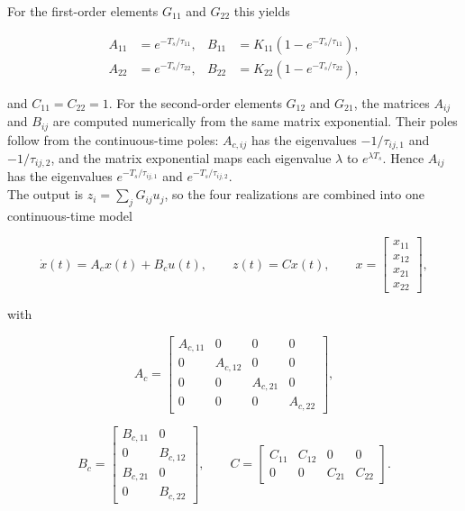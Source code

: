For the first-order elements $G_{11}$ and $G_{22}$ this yields

\begin{align}
  A_{11} &= e^{-T_s/\tau_{11}}, & B_{11} &= K_{11}\left(1-e^{-T_s/\tau_{11}}\right), \\
  A_{22} &= e^{-T_s/\tau_{22}}, & B_{22} &= K_{22}\left(1-e^{-T_s/\tau_{22}}\right),
\end{align}

and $C_{11}=C_{22}=1$. For the second-order elements $G_{12}$ and $G_{21}$, the matrices $A_{ij}$ and $B_{ij}$ are computed numerically from the same matrix exponential. Their poles follow from the continuous-time poles: $A_{c,ij}$ has the eigenvalues $-1/\tau_{ij,1}$ and $-1/\tau_{ij,2}$, and the matrix exponential maps each eigenvalue $\lambda$ to $e^{\lambda T_s}$. Hence $A_{ij}$ has the eigenvalues $e^{-T_s/\tau_{ij,1}}$ and $e^{-T_s/\tau_{ij,2}}$. \\

The output is $z_i=\sum_j G_{ij}u_j$, so the four realizations are combined into one continuous-time model

\begin{equation}
  \dot x(t)=A_cx(t)+B_cu(t),\qquad z(t)=Cx(t),\qquad
  x=\begin{bmatrix}x_{11}\\x_{12}\\x_{21}\\x_{22}\end{bmatrix},
\end{equation}

with

\begin{equation}
  A_c = \begin{bmatrix}
    A_{c,11} & 0        & 0        & 0 \\
    0        & A_{c,12} & 0        & 0 \\
    0        & 0        & A_{c,21} & 0 \\
    0        & 0        & 0        & A_{c,22}
  \end{bmatrix},
\end{equation}

\begin{equation}
  B_c = \begin{bmatrix}B_{c,11}&0\\0&B_{c,12}\\B_{c,21}&0\\0&B_{c,22}\end{bmatrix},
  \qquad
  C = \begin{bmatrix}C_{11}&C_{12}&0&0\\0&0&C_{21}&C_{22}\end{bmatrix}.
\end{equation}

